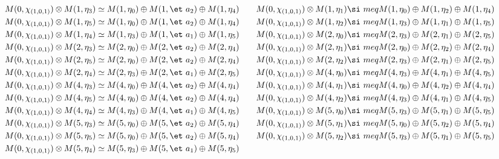 \begin{align*}
\\
M(0,\chi_{(1,0,1)}) &\otimes M(1,\eta_{3}) \simeq M(1,\eta_{0}) \oplus M(1,\et\
a_{2}) \oplus M(1,\eta_{4}) &&& M(0,\chi_{(1,0,1)}) &\otimes M(1,\eta_{1}) \si\
meq M(1,\eta_{0}) \oplus M(1,\eta_{2}) \oplus M(1,\eta_{4})\\
M(0,\chi_{(1,0,1)}) &\otimes M(1,\eta_{5}) \simeq M(1,\eta_{0}) \oplus M(1,\et\
a_{2}) \oplus M(1,\eta_{4}) &&& M(0,\chi_{(1,0,1)}) &\otimes M(1,\eta_{2}) \si\
meq M(1,\eta_{3}) \oplus M(1,\eta_{1}) \oplus M(1,\eta_{5})\\
M(0,\chi_{(1,0,1)}) &\otimes M(1,\eta_{4}) \simeq M(1,\eta_{3}) \oplus M(1,\et\
a_{1}) \oplus M(1,\eta_{5}) &&& M(0,\chi_{(1,0,1)}) &\otimes M(2,\eta_{0}) \si\
meq M(2,\eta_{3}) \oplus M(2,\eta_{1}) \oplus M(2,\eta_{5})\\
M(0,\chi_{(1,0,1)}) &\otimes M(2,\eta_{3}) \simeq M(2,\eta_{0}) \oplus M(2,\et\
a_{2}) \oplus M(2,\eta_{4}) &&& M(0,\chi_{(1,0,1)}) &\otimes M(2,\eta_{1}) \si\
meq M(2,\eta_{0}) \oplus M(2,\eta_{2}) \oplus M(2,\eta_{4})\\
M(0,\chi_{(1,0,1)}) &\otimes M(2,\eta_{5}) \simeq M(2,\eta_{0}) \oplus M(2,\et\
a_{2}) \oplus M(2,\eta_{4}) &&& M(0,\chi_{(1,0,1)}) &\otimes M(2,\eta_{2}) \si\
meq M(2,\eta_{3}) \oplus M(2,\eta_{1}) \oplus M(2,\eta_{5})\\
M(0,\chi_{(1,0,1)}) &\otimes M(2,\eta_{4}) \simeq M(2,\eta_{3}) \oplus M(2,\et\
a_{1}) \oplus M(2,\eta_{5}) &&& M(0,\chi_{(1,0,1)}) &\otimes M(4,\eta_{0}) \si\
meq M(4,\eta_{3}) \oplus M(4,\eta_{1}) \oplus M(4,\eta_{5})\\
M(0,\chi_{(1,0,1)}) &\otimes M(4,\eta_{3}) \simeq M(4,\eta_{0}) \oplus M(4,\et\
a_{2}) \oplus M(4,\eta_{4}) &&& M(0,\chi_{(1,0,1)}) &\otimes M(4,\eta_{1}) \si\
meq M(4,\eta_{0}) \oplus M(4,\eta_{2}) \oplus M(4,\eta_{4})\\
M(0,\chi_{(1,0,1)}) &\otimes M(4,\eta_{5}) \simeq M(4,\eta_{0}) \oplus M(4,\et\
a_{2}) \oplus M(4,\eta_{4}) &&& M(0,\chi_{(1,0,1)}) &\otimes M(4,\eta_{2}) \si\
meq M(4,\eta_{3}) \oplus M(4,\eta_{1}) \oplus M(4,\eta_{5})\\
M(0,\chi_{(1,0,1)}) &\otimes M(4,\eta_{4}) \simeq M(4,\eta_{3}) \oplus M(4,\et\
a_{1}) \oplus M(4,\eta_{5}) &&& M(0,\chi_{(1,0,1)}) &\otimes M(5,\eta_{0}) \si\
meq M(5,\eta_{3}) \oplus M(5,\eta_{1}) \oplus M(5,\eta_{5})\\
M(0,\chi_{(1,0,1)}) &\otimes M(5,\eta_{3}) \simeq M(5,\eta_{0}) \oplus M(5,\et\
a_{2}) \oplus M(5,\eta_{4}) &&& M(0,\chi_{(1,0,1)}) &\otimes M(5,\eta_{1}) \si\
meq M(5,\eta_{0}) \oplus M(5,\eta_{2}) \oplus M(5,\eta_{4})\\
M(0,\chi_{(1,0,1)}) &\otimes M(5,\eta_{5}) \simeq M(5,\eta_{0}) \oplus M(5,\et\
a_{2}) \oplus M(5,\eta_{4}) &&& M(0,\chi_{(1,0,1)}) &\otimes M(5,\eta_{2}) \si\
meq M(5,\eta_{3}) \oplus M(5,\eta_{1}) \oplus M(5,\eta_{5})\\
M(0,\chi_{(1,0,1)}) &\otimes M(5,\eta_{4}) \simeq M(5,\eta_{3}) \oplus M(5,\et\
a_{1}) \oplus M(5,\eta_{5})\\
\end{align*}

